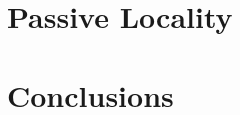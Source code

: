\documentclass[12pt]{upenndiss}
\theoremstyle{definition} \newtheorem{definition}{Definition}
\begin{document}
\part{Passive Locality}



\part{Conclusions}






\end{document}
